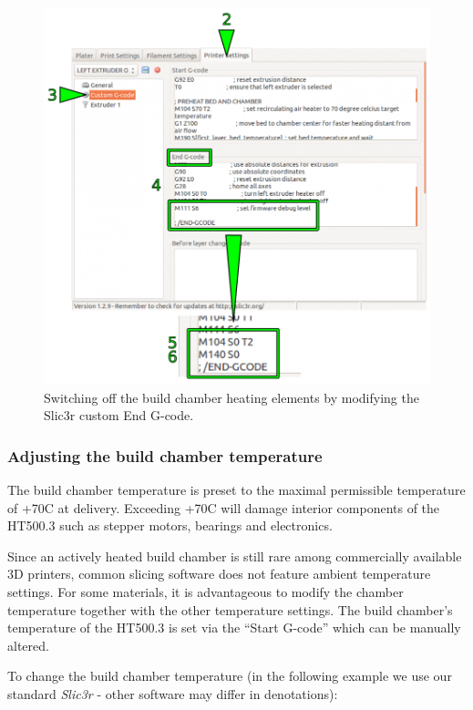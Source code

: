 \begin{figure}[H]
  \centering
  \includegraphics[width=.7\linewidth]{./img/tt_slic3r_modify_endgcode_autooff.png}
  \caption{Switching off the build chamber heating elements by modifying the Slic3r 
           custom End G-code.}
\end{figure}

\subsubsection{Adjusting the build chamber temperature}

\begin{notice}
  The build chamber temperature is preset to the maximal permissible temperature 
  of +70\degree C at delivery.
  Exceeding +70\degree C will damage interior components of the HT500.3 such as stepper motors, bearings and electronics.
\end{notice}

Since an actively heated build chamber is still rare among commercially available 3D printers, common slicing software does not feature ambient temperature settings. For some materials, it is advantageous to modify the chamber temperature together with the other temperature settings. The build chamber's temperature of the HT500.3 is set via the “Start G-code” which can be manually altered.

To change the build chamber temperature (in the following example we use our standard 
\emph{Slic3r} - other software may differ in denotations):

